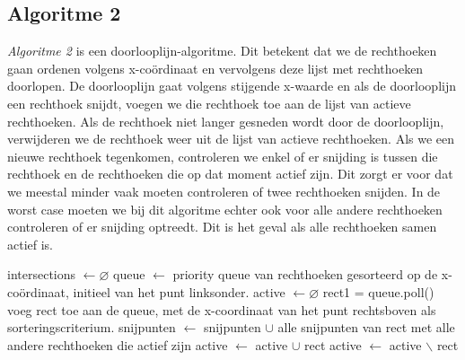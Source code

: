 \documentclass[11pt,a4paper,titlepage]{article}
\begin{document}
	\subsection{Algoritme 2}
	\emph{Algoritme 2} is een doorlooplijn-algoritme. Dit betekent dat we de rechthoeken gaan ordenen volgens x-coördinaat en vervolgens deze lijst met rechthoeken doorlopen. De doorlooplijn gaat volgens stijgende x-waarde en als de doorlooplijn een rechthoek snijdt, voegen we die rechthoek toe aan de lijst van actieve rechthoeken. Als de rechthoek niet langer gesneden wordt door de doorlooplijn, verwijderen we de rechthoek weer uit de lijst van actieve rechthoeken. Als we een nieuwe rechthoek tegenkomen, controleren we enkel of er snijding is tussen die rechthoek en de rechthoeken die op dat moment actief zijn. Dit zorgt er voor dat we meestal minder vaak moeten controleren of twee rechthoeken snijden. In de worst case moeten we bij dit algoritme echter ook voor alle andere rechthoeken controleren of er snijding optreedt. Dit is het geval als alle rechthoeken samen actief is.
	\begin{algorithm}[H]
		\caption{}
		\begin{algorithmic}[1]
			\State intersections $\gets \varnothing $
			\State queue $\gets$ priority queue van rechthoeken gesorteerd op de x-coördinaat, initieel van het punt linksonder.
			\State active $\gets \varnothing$
				\State rect1 = queue.poll()
					\State voeg rect toe aan de queue, met de x-coordinaat van het punt rechtsboven als sorteringscriterium.
					\State snijpunten $\gets$ snijpunten $\cup$ alle snijpunten van rect met alle andere rechthoeken die actief zijn
					\State active $\gets$ active $\cup$ rect
				\Else
					\State active $\gets$ active $\backslash$ rect
				\EndIf
			\EndWhile
		\end{algorithmic}
	\end{algorithm}
	
\end{document}
